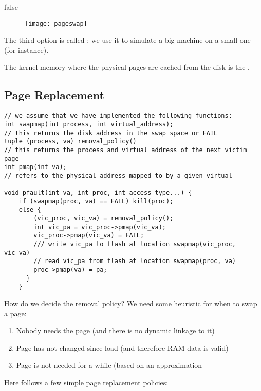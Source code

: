 \documentclass[../../lecture_notes.tex]{subfiles}
\begin{document}
\if false
\begin{figure}[h!]
	\centering
	\texttt{[image: pageswap]}
\end{figure}
\fi
The third option is called ; we use it to simulate a big machine on a small one (for instance).

The kernel memory where the physical pages are cached from the disk is the .

\subsection{Page Replacement}
\begin{lstlisting}
// we assume that we have implemented the following functions:
int swapmap(int process, int virtual_address);
// this returns the disk address in the swap space or FAIL
tuple (process, va) removal_policy()
// this returns the process and virtual address of the next victim page
int pmap(int va);
// refers to the physical address mapped to by a given virtual

void pfault(int va, int proc, int access_type...) {
	if (swapmap(proc, va) == FALL) kill(proc);
	else {
		(vic_proc, vic_va) = removal_policy();
		int vic_pa = vic_proc->pmap(vic_va);
		vic_proc->pmap(vic_va) = FAIL;
		/// write vic_pa to flash at location swapmap(vic_proc, vic_va)
		// read vic_pa from flash at location swapmap(proc, va)
        proc->pmap(va) = pa;
      }
    }
\end{lstlisting}

How do we decide the removal policy? We need some heuristic for when to swap a page:
\begin{enumerate}[label=(\alph*), nosep]
	\item Nobody needs the page (and there is no dynamic linkage to it)
	\item Page has not changed since load (and therefore RAM data is valid)
	\item Page is not needed for a while (based on an approximation
\end{enumerate}


Here follows a few simple page replacement policies:
\end{document}
